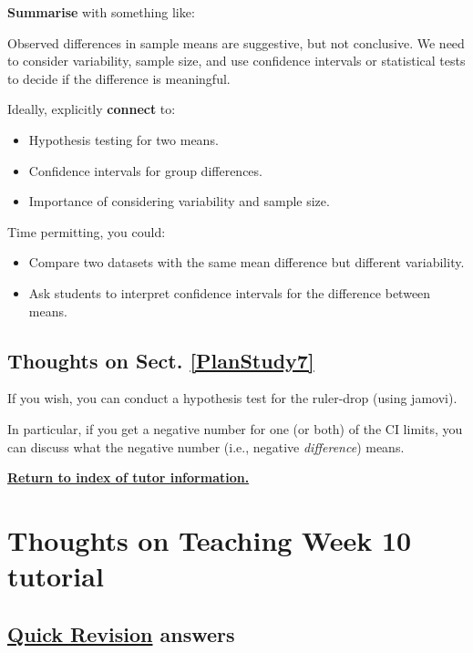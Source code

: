 \documentclass[
  11pt,
  a4paper,
  krantz2]{krantz}
\makeatletter
\providecommand{\tightlist}{%
  \setlength{\itemsep}{0pt}\setlength{\parskip}{0pt}}
\renewenvironment{quote}%
{\begin{kframe}}
{\end{kframe}}
\newenvironment{kframe}{%
\medskip{}
\setlength{\fboxsep}{.8em}
 \def\at@end@of@kframe{}%
 \ifinner\ifhmode%
  \def\at@end@of@kframe{\end{minipage}}%
  \begin{minipage}{\columnwidth}%
 \fi\fi%
 \def\FrameCommand##1{\hskip\@totalleftmargin \hskip-\fboxsep
 \colorbox{shadecolor}{##1}\hskip-\fboxsep
     \hskip-\linewidth \hskip-\@totalleftmargin \hskip\columnwidth}%
 \MakeFramed {\advance\hsize-\width
   \@totalleftmargin\z@ \linewidth\hsize
   \@setminipage}}%
 {\par\unskip\endMakeFramed%
 \at@end@of@kframe}
\renewenvironment{quote}
               {\list{}{\vspace{-0.5em}\begin{kframe}\small%
                        \rightmargin   \leftmargin
                        \parsep        \z@ \@plus\p@}%
                \item\relax}
               {\end{kframe}\endlist}
\makeatother
\begin{document}
\textbf{Summarise} with something like:

\begin{quote}
Observed differences in sample means are suggestive, but not conclusive.
We need to consider variability, sample size, and use confidence intervals or statistical tests to decide if the difference is meaningful.
\end{quote}

Ideally, explicitly \textbf{connect} to:

\begin{itemize}
\tightlist
\item
  Hypothesis testing for two means.
\item
  Confidence intervals for group differences.
\item
  Importance of considering variability and sample size.
\end{itemize}

Time permitting, you could:

\begin{itemize}
\tightlist
\item
  Compare two datasets with the same mean difference but different variability.
\item
  Ask students to interpret confidence intervals for the difference between means.
\end{itemize}

\subsection{Thoughts on Sect. \ref{PlanStudy7}}\label{thoughts-on-sect.-refplanstudy7}

If you wish, you can conduct a hypothesis test for the ruler-drop (using jamovi).

In particular, if you get a negative number for one (or both) of the CI limits, you can discuss what the negative number (i.e., negative \emph{difference}) means.

\href{TutorInfo.html}{\textbf{Return to index of tutor information.}}

\section{Thoughts on Teaching Week 10 tutorial}\label{Lecture10ThoughtsForTutors}

\subsection{\texorpdfstring{\hyperref[QuickRevision-Tutorial10]{Quick Revision} answers}{Quick Revision answers}}\label{quick-revision-answers-9}
\end{document}
